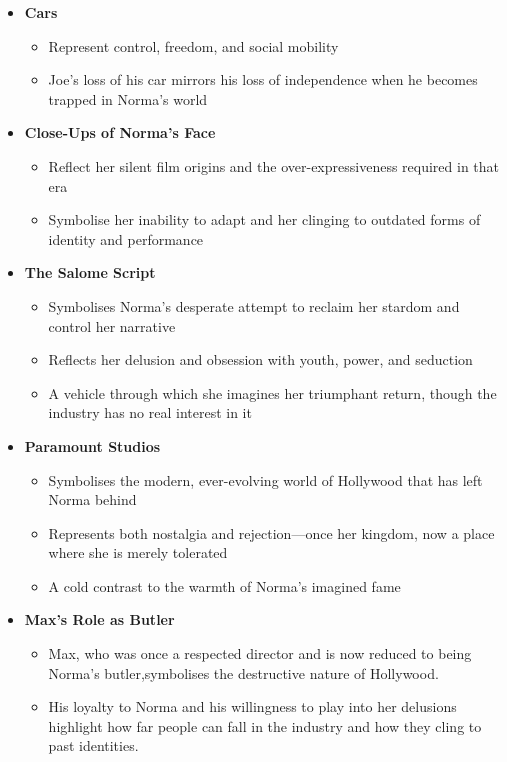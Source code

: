 \documentclass[a4paper]{article}
\begin{document}
\begin{itemize}
    \item \textbf{Cars}  
    \begin{itemize}
        \item Represent control, freedom, and social mobility  
        \item Joe’s loss of his car mirrors his loss of independence when he becomes trapped in Norma’s world  
    \end{itemize}

    \item \textbf{Close-Ups of Norma’s Face}  
    \begin{itemize}
        \item Reflect her silent film origins and the over-expressiveness required in that era  
        \item Symbolise her inability to adapt and her clinging to outdated forms of identity and performance  
    \end{itemize}

\item \textbf{The Salome Script}  
    \begin{itemize}
        \item Symbolises Norma’s desperate attempt to reclaim her stardom and control her narrative  
        \item Reflects her delusion and obsession with youth, power, and seduction  
        \item A vehicle through which she imagines her triumphant return, though the industry has no real interest in it  
    \end{itemize}

\item \textbf{Paramount Studios}  
    \begin{itemize}
        \item Symbolises the modern, ever-evolving world of Hollywood that has left Norma behind  
        \item Represents both nostalgia and rejection—once her kingdom, now a place where she is merely tolerated  
        \item A cold contrast to the warmth of Norma’s imagined fame  
    \end{itemize}

\item \textbf{Max’s Role as Butler}  
    \begin{itemize}
        \item Max, who was once a respected director and is now reduced to being Norma’s butler,symbolises the destructive nature of Hollywood.
        \item His loyalty to Norma and his willingness to play into her delusions highlight how far people can fall in the industry and how they cling to past identities.
    \end{itemize}


\end{itemize}
\end{document}
